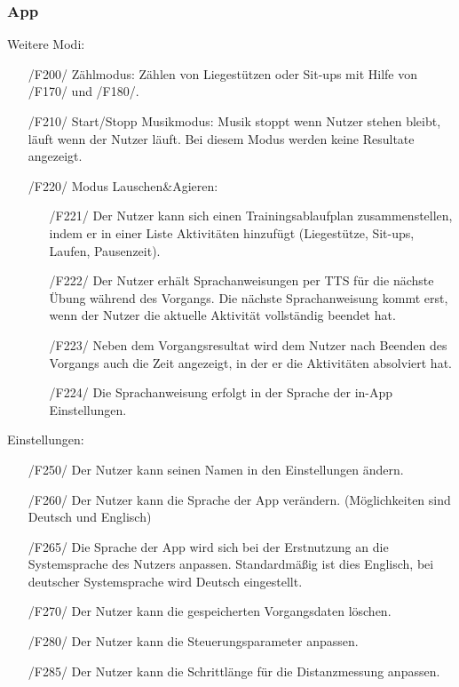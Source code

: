 \documentclass[a4paper,12pt]{article}
\begin{document}
    \subsubsection{App}
    \textsf{Weitere Modi:}
    \begin{itemize}

       
       
        \item[/F200/] \textsf{Zählmodus:} Zählen von Liegestützen oder Sit-ups mit Hilfe von /F170/ und /F180/.
        \item[/F210/] \textsf{Start/Stopp Musikmodus:} Musik stoppt wenn Nutzer stehen bleibt, läuft wenn der Nutzer läuft. Bei diesem Modus werden keine Resultate angezeigt.
      
 	    \item[/F220/] \textsf{Modus \glqq Lauschen\&Agieren\grqq:}
 	    \begin{itemize}
        \item[/F221/]Der Nutzer kann sich einen Trainingsablaufplan zusammenstellen, indem er in einer Liste Aktivitäten hinzufügt (Liegestütze, Sit-ups, Laufen, Pausenzeit). 
        \item[/F222/] Der Nutzer erhält Sprachanweisungen per \Gls{TTS} für die nächste Übung während des Vorgangs. Die nächste Sprachanweisung kommt erst, wenn der Nutzer die aktuelle Aktivität vollständig beendet hat.
        \item[/F223/] Neben dem Vorgangsresultat wird dem Nutzer nach Beenden des Vorgangs auch die Zeit angezeigt, in der er die Aktivitäten absolviert hat.
        \item[/F224/] Die Sprachanweisung erfolgt in der Sprache der in-App Einstellungen.
    	\end{itemize}
   \end{itemize}
		\textsf{Einstellungen:}
   \begin{itemize}
        \item[/F250/] Der Nutzer kann seinen Namen in den Einstellungen ändern.
        \item[/F260/] Der Nutzer kann die Sprache der App verändern. (Möglichkeiten sind Deutsch und Englisch)
        \item[/F265/] Die Sprache der App wird sich bei der Erstnutzung an die Systemsprache des Nutzers anpassen. Standardmäßig ist dies Englisch, bei deutscher Systemsprache wird Deutsch eingestellt.
        \item[/F270/] Der Nutzer kann die gespeicherten \Gls{Vorgangsdaten} löschen.
        \item[/F280/] Der Nutzer kann die \Gls{Steuerungsparameter} anpassen. 
        \item[/F285/] Der Nutzer kann die Schrittlänge für die Distanzmessung anpassen.
  	\end{itemize}
\end{document}
